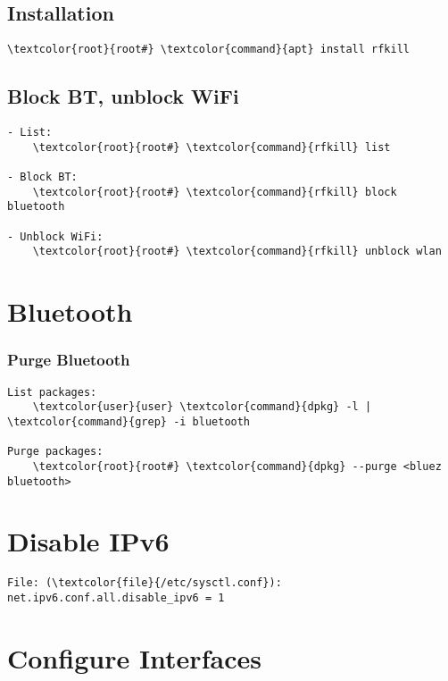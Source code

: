 \documentclass[10pt, a4paper, onecolumn, openany]{book} %
\begin{document}
\subsection{Installation}
\begin{Verbatim}[commandchars=\\\{\}]
    \textcolor{root}{root#} \textcolor{command}{apt} install rfkill
\end{Verbatim}
\subsection{Block BT, unblock WiFi}
\begin{Verbatim}[commandchars=\\\{\}]
- List:
    \textcolor{root}{root#} \textcolor{command}{rfkill} list

- Block BT:
    \textcolor{root}{root#} \textcolor{command}{rfkill} block bluetooth
    
- Unblock WiFi:
    \textcolor{root}{root#} \textcolor{command}{rfkill} unblock wlan
\end{Verbatim}

\section{Bluetooth}
\subsubsection{Purge Bluetooth}
\begin{Verbatim}[commandchars=\\\{\}]
List packages:
    \textcolor{user}{user} \textcolor{command}{dpkg} -l | \textcolor{command}{grep} -i bluetooth

Purge packages:
    \textcolor{root}{root#} \textcolor{command}{dpkg} --purge <bluez bluetooth>
\end{Verbatim}

\section{Disable IPv6}
\begin{Verbatim}[commandchars=\\\{\}]
File: (\textcolor{file}{/etc/sysctl.conf}):
net.ipv6.conf.all.disable_ipv6 = 1
\end{Verbatim}

\section{Configure Interfaces}
\end{document}
